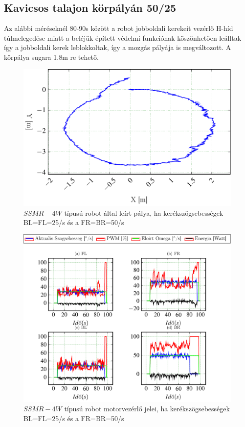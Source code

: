 \subsection{Kavicsos talajon körpályán 50/25}

Az alábbi méréseknél 80-90s között a robot jobboldali kerekeit vezérlő H-híd túlmelegedése miatt a beléjük épített védelmi funkciónak köszönhetően leálltak így a jobboldali kerek leblokkoltak, így a mozgás pályája is megváltozott.
A körpálya sugara 1.8m re tehető.


\renewcommand{\GlobalPath}{Meresek/Mozgasok/NormalMukodes/Korpalya_07_03_Kavicsos/}
\renewcommand{\secondImage}{*}

\begin{figure}[H]
	\begin{center}
  		\includegraphics[scale=0.8]{tikz/KorP0703b.pdf}
  	\end{center}
  \caption{$SSMR-4W$ típusú robot által leírt pálya, ha kerékszögsebességek BL=FL=25\degree/s és a FR=BR=50\degree/s}
  \label{fig:KorP0703b}
\end{figure}

\begin{figure}[H]
  \includegraphics{tikz/KorP0703x.pdf}
  \caption{$SSMR-4W$ típusú robot motorvezérlő jelei, ha kerékszögsebességek BL=FL=25\degree/s és a FR=BR=50\degree/s}
  \label{fig:KorP0703x}
\end{figure}


